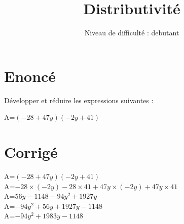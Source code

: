 \documentclass{article}%
\title{Distributivité}%
\author{Niveau de difficulté : debutant}%
\date{{}}%
\begin{document}
%
\normalsize%
\pagestyle{empty}%
\maketitle%
\section{Enoncé}%
\label{sec:Enonc}%
Développer et réduire les expressions suivantes :%
\newline%
%
\newline%
%
\begin{minipage}{0.5\textwidth}%
A=$(-28+47y)(-2y+41)$\\%
\end{minipage}

%
\newpage%
\section{Corrigé}%
\label{sec:Corrig}%
\begin{minipage}{0.5\textwidth}%
A=$(-28+47y)(-2y+41)$\\%
A=$-28 \times (-2y)-28 \times 41+47y \times (-2y)+47y \times 41$\\%
A=$56y-1148-94y^2+1927y$\\%
A=$-94y^2+56y+1927y-1148$\\%
A=$-94y^2+1983y-1148$\\%
\end{minipage}

%
\end{document}
